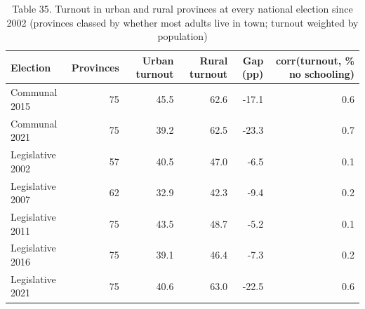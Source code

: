 \begin{table}
\caption{Table 35. Turnout in urban and rural provinces at every national election since 2002 (provinces classed by whether most adults live in town; turnout weighted by population)}
\label{tab:T35_turnout_every_election}
\begin{tabular}{lrrrrr}
\toprule
Election & Provinces & Urban turnout & Rural turnout & Gap (pp) & corr(turnout, \% no schooling) \\
\midrule
Communal 2015 & 75 & 45.5 & 62.6 & -17.1 & 0.6 \\
Communal 2021 & 75 & 39.2 & 62.5 & -23.3 & 0.7 \\
Legislative 2002 & 57 & 40.5 & 47.0 & -6.5 & 0.1 \\
Legislative 2007 & 62 & 32.9 & 42.3 & -9.4 & 0.2 \\
Legislative 2011 & 75 & 43.5 & 48.7 & -5.2 & 0.1 \\
Legislative 2016 & 75 & 39.1 & 46.4 & -7.3 & 0.2 \\
Legislative 2021 & 75 & 40.6 & 63.0 & -22.5 & 0.6 \\
\bottomrule
\end{tabular}
\end{table}

